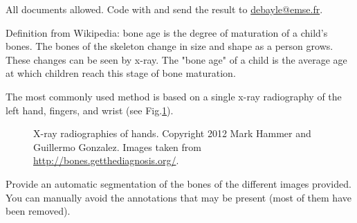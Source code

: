 \begin{note}All documents allowed. Code with \matlabregistered{} and send the result to \href{mailto:debayle@emse.fr}{debayle@emse.fr}.\end{note}

Definition from Wikipedia: bone age is the degree of maturation of a child's bones. The bones of the skeleton change in size and shape as a person grows. These changes can be seen by x-ray. The "bone age" of a child is the average age at which children reach this stage of bone maturation.

The most commonly used method is based on a single x-ray radiography of the left hand, fingers, and wrist (see Fig.\ref{fig:mispa:exam_2018:radio}).

\begin{figure}[htbp]
 \hfill
 
 \caption{X-ray radiographies of hands. Copyright 2012 Mark Hammer and Guillermo Gonzalez. Images taken from \url{http://bones.getthediagnosis.org/}. }
 \label{fig:mispa:exam_2018:radio}
\end{figure}


\begin{qbox}
 Provide an automatic segmentation of the bones of the different images provided. You can manually avoid the annotations that may be present (most of them have been removed).
\end{qbox}
